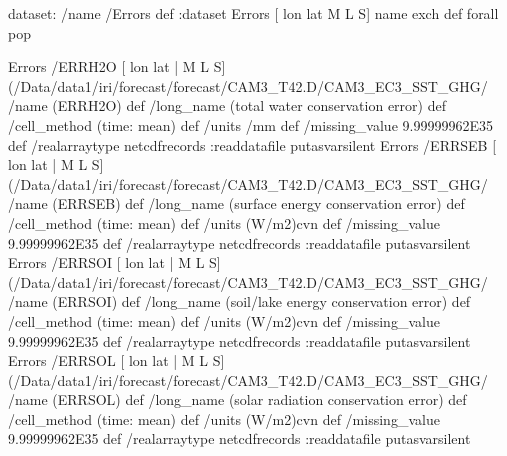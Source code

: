 \begin{ingrid}
dataset: /name /Errors def :dataset
Errors [ lon lat M L S] {name exch def} forall pop

Errors /ERRH2O{
[ lon lat | M L S] (/Data/data1/iri/forecast/forecast/CAM3_T42.D/CAM3_EC3_SST_GHG/%
/name (ERRH2O) def
 /long_name (total water conservation error) def
 /cell_method (time: mean) def
 /units /mm def
 /missing_value 9.99999962E35 def
 /realarraytype netcdfrecords :readdatafile
}putasvarsilent
Errors /ERRSEB{
[ lon lat | M L S] (/Data/data1/iri/forecast/forecast/CAM3_T42.D/CAM3_EC3_SST_GHG/%
/name (ERRSEB) def
 /long_name (surface energy conservation error) def
 /cell_method (time: mean) def
 /units (W/m2)cvn def
 /missing_value 9.99999962E35 def
 /realarraytype netcdfrecords :readdatafile
}putasvarsilent
Errors /ERRSOI{
[ lon lat | M L S] (/Data/data1/iri/forecast/forecast/CAM3_T42.D/CAM3_EC3_SST_GHG/%
/name (ERRSOI) def
 /long_name (soil/lake energy conservation error) def
 /cell_method (time: mean) def
 /units (W/m2)cvn def
 /missing_value 9.99999962E35 def
 /realarraytype netcdfrecords :readdatafile
}putasvarsilent
Errors /ERRSOL{
[ lon lat | M L S] (/Data/data1/iri/forecast/forecast/CAM3_T42.D/CAM3_EC3_SST_GHG/%
/name (ERRSOL) def
 /long_name (solar radiation conservation error) def
 /cell_method (time: mean) def
 /units (W/m2)cvn def
 /missing_value 9.99999962E35 def
 /realarraytype netcdfrecords :readdatafile
}putasvarsilent


\end{ingrid}
